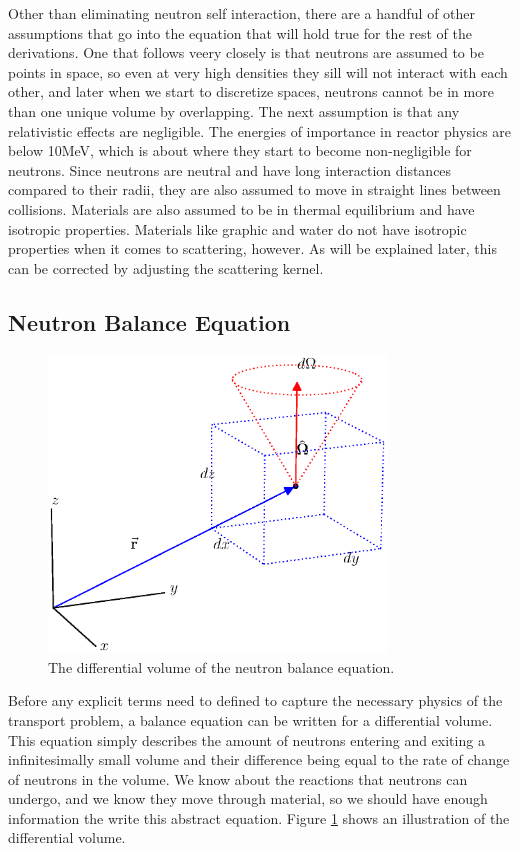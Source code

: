 Other than eliminating neutron self interaction, there are a handful of other assumptions that go into the equation that will hold true for the rest of the derivations.  One that follows veery closely is that neutrons are assumed to be points in space, so even at very high densities they sill will not interact with each other, and later when we start to discretize spaces, neutrons cannot be in more than one unique volume by overlapping.  The next assumption is that any relativistic effects are negligible.  The energies of importance in reactor physics are below 10MeV, which is about where they start to become non-negligible for neutrons.  Since neutrons are neutral and have long interaction distances compared to their radii, they are also assumed to move in straight lines between collisions.  Materials are also assumed to be in thermal equilibrium and have isotropic properties.  Materials like graphic and water do not have isotropic properties when it comes to scattering, however.  As will be explained later, this can be corrected by adjusting the scattering kernel.

\subsection{Neutron Balance Equation}

\begin{figure}[h!] 
  \centering
    \includegraphics[width=0.8\textwidth,trim= 0cm 2.5cm 0cm 0cm]{graphics/diff_balance.eps} 
     \caption{The differential volume of the neutron balance equation. \label{diff_volume}}
\end{figure}

Before any explicit terms need to defined to capture the necessary physics of the transport problem, a balance equation can be written for a differential volume.  This equation simply describes the amount of neutrons entering and exiting a infinitesimally small volume and their difference being equal to the rate of change of neutrons in the volume.  We know about the reactions that neutrons can undergo, and we know they move through material, so we should have  enough information the write this abstract equation. Figure \ref{diff_volume} shows an illustration of the differential volume.


